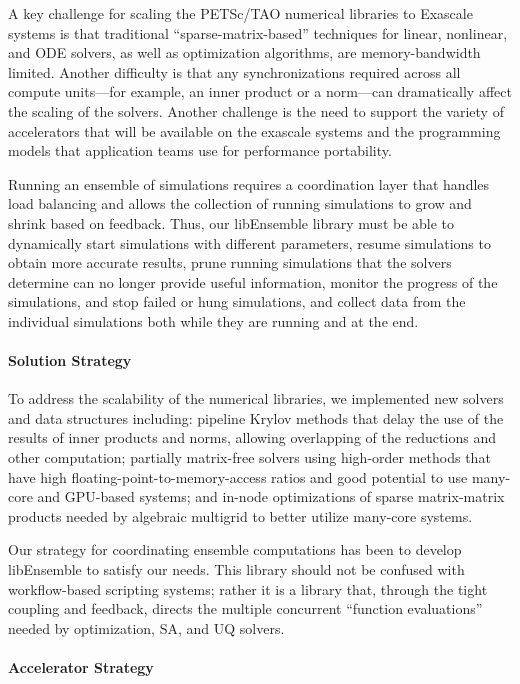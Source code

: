 A key challenge for scaling the PETSc/TAO numerical libraries to Exascale systems is that traditional 
``sparse-matrix-based'' techniques for linear, nonlinear, and ODE solvers, as well as optimization 
algorithms, are memory-bandwidth limited.  Another difficulty is that any synchronizations 
required across all compute units---for example, an inner product or a norm---can 
dramatically affect the scaling of the solvers.  Another challenge is the need to
support the variety of accelerators that will be available on the exascale systems
and the programming models that application teams use for performance
portability.

Running an ensemble of simulations requires a coordination layer that handles load balancing and
allows the collection of running simulations to grow and shrink based on feedback. Thus, our
libEnsemble library must be able to dynamically start simulations with different parameters, 
resume simulations to obtain more accurate results, prune running simulations that the solvers 
determine can no longer provide useful information, monitor the progress of the simulations, 
and stop failed or hung simulations, and collect data from the individual simulations both 
while they are running and at the end.

\paragraph{Solution Strategy}

To address the scalability of the numerical libraries, we implemented new solvers and data 
structures including: pipeline Krylov methods that delay the use of the results of inner 
products and norms, allowing overlapping of the reductions and other computation; partially 
matrix-free solvers using high-order methods that have high floating-point-to-memory-access 
ratios and good potential to use many-core and GPU-based systems; and in-node optimizations 
of sparse matrix-matrix products needed by algebraic multigrid to better utilize many-core 
systems.

Our strategy for coordinating ensemble computations has been to develop libEnsemble
to satisfy our needs.  This library should not be confused with workflow-based 
scripting systems; rather it is a library that, through the tight coupling and 
feedback, directs the multiple concurrent ``function evaluations'' needed by 
optimization, SA, and UQ solvers.

\paragraph{Accelerator Strategy}

